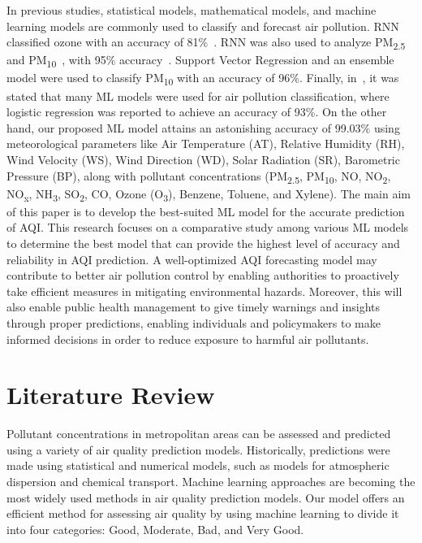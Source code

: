 \documentclass[conference]{IEEEtran}
\begin{document}
In previous studies, statistical models, mathematical models, and machine learning models are commonly used to classify and forecast air pollution. RNN classified ozone with an accuracy of 81\%~\cite{b1}. RNN was also used to analyze PM\textsubscript{2.5} and PM\textsubscript{10}~\cite{b2}, with 95\% accuracy~\cite{b3}. Support Vector Regression and an ensemble model were used to classify PM\textsubscript{10} with an accuracy of 96\%. Finally, in~\cite{b4}, it was stated that many ML models were used for air pollution classification, where logistic regression was reported to achieve an accuracy of 93\%. On the other hand, our proposed ML model attains an astonishing accuracy of 99.03\% using meteorological parameters like Air Temperature (AT), Relative Humidity (RH), Wind Velocity (WS), Wind Direction (WD), Solar Radiation (SR), Barometric Pressure (BP), along with pollutant concentrations (PM\textsubscript{2.5}, PM\textsubscript{10}, NO, NO\textsubscript{2}, NO\textsubscript{x}, NH\textsubscript{3}, SO\textsubscript{2}, CO, Ozone (O\textsubscript{3}), Benzene, Toluene, and Xylene). The main aim of this paper is to develop the best-suited ML model for the accurate prediction of AQI. This research focuses on a comparative study among various ML models to determine the best model that can provide the highest level of accuracy and reliability in AQI prediction. A well-optimized AQI forecasting model may contribute to better air pollution control by enabling authorities to proactively take efficient measures in mitigating environmental hazards. Moreover, this will also enable public health management to give timely warnings and insights through proper predictions, enabling individuals and policymakers to make informed decisions in order to reduce exposure to harmful air pollutants.

\section{Literature Review}
Pollutant concentrations in metropolitan areas can be assessed and predicted using a variety of air quality prediction models. Historically, predictions were made using statistical and numerical models, such as models for atmospheric dispersion and chemical transport. Machine learning approaches are becoming the most widely used methods in air quality prediction models. Our model offers an efficient method for assessing air quality by using machine learning to divide it into four categories: Good, Moderate, Bad, and Very Good.
\end{document}
